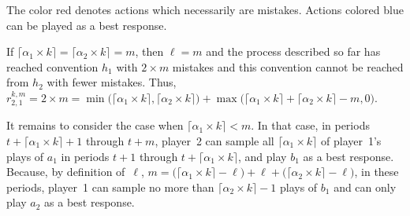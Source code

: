 \documentclass[11.5pt]{article}
\begin{document}
\begin{table}[htbp]
\centering
{}
\small
The color red denotes actions which necessarily are mistakes. Actions colored blue can be played as a best response.
\end{table}


If $\lceil \alpha_1 \times k \rceil = \lceil \alpha_2 \times k \rceil = m$, then $\ell=m$ and the process described so far has reached convention $h_1$ with $2\times m$ mistakes and this convention cannot be reached from $h_2$ with fewer mistakes. Thus, $r_{2,1}^{k,m} = 2\times m = \min\big(\lceil \alpha_1 \times k \rceil,\lceil \alpha_2 \times k \rceil\big) + \max\big(\lceil\alpha_1\times k\rceil+\lceil \alpha_2 \times k \rceil-m,0\big)$. 

It remains to consider the case when $\lceil \alpha_1 \times k \rceil <m$.
%
In that case, in periods $t+\lceil \alpha_1 \times k \rceil + 1$ through $t + m$, player~2 can sample all $\lceil \alpha_1 \times k \rceil$ of player~1's plays of $a_1$ in periods $t+1$ through $t+\lceil \alpha_1 \times k \rceil$, and play $b_1$ as a best response.
%
Because, by definition of~$\ell$, $m = \big(\lceil \alpha_1 \times k \rceil -\ell \big) + \ell + \big(\lceil \alpha_2 \times k \rceil -\ell\big)$, in these periods, player~1 can sample no more than $\lceil \alpha_2 \times k \rceil - 1$ plays of $b_1$ and can only play $a_2$ as a best response. 
\end{document}
